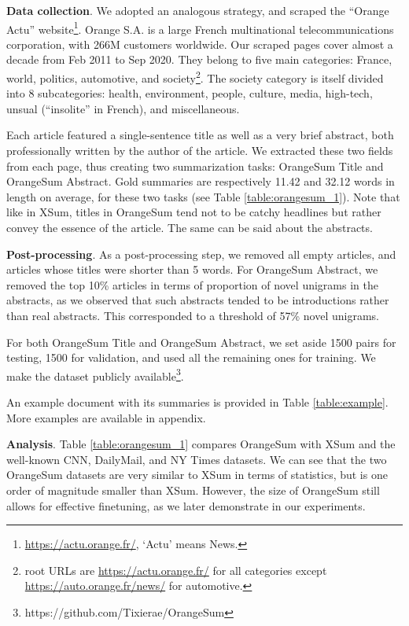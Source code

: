 \documentclass[11pt,a4paper]{article}
\begin{document}
\noindent \textbf{Data collection}.
We adopted an analogous strategy, and scraped the ``Orange Actu'' website\footnote{\url{https://actu.orange.fr/}, `Actu' means News.}.
Orange S.A. is a large French multinational telecommunications corporation, with 266M customers worldwide.
Our scraped pages cover almost a decade from Feb 2011 to Sep 2020.
They belong to five main categories: France, world, politics, automotive, and society\footnote{root URLs are \url{https://actu.orange.fr/} for all categories except \url{https://auto.orange.fr/news/} for automotive.}.
The society category is itself divided into 8 subcategories: health, environment, people, culture, media, high-tech, unsual (``insolite'' in French), and miscellaneous.

Each article featured a single-sentence title as well as a very brief abstract, both professionally written by the author of the article.
We extracted these two fields from each page, thus creating two summarization tasks: OrangeSum Title and OrangeSum Abstract.
Gold summaries are respectively 11.42 and 32.12 words in length on average, for these two tasks (see Table \ref{table:orangesum_1}).
Note that like in XSum, titles in OrangeSum tend not to be catchy headlines but rather convey the essence of the article.
The same can be said about the abstracts.

\noindent \textbf{Post-processing}.
As a post-processing step, we removed all empty articles, and articles whose titles were shorter than 5 words.
For OrangeSum Abstract, we removed the top 10\% articles in terms of proportion of novel unigrams in the abstracts, as we observed that such abstracts tended to be introductions rather than real abstracts.
This corresponded to a threshold of 57\% novel unigrams.

For both OrangeSum Title and OrangeSum Abstract, we set aside 1500 pairs for testing, 1500 for validation, and used all the remaining ones for training.
We make the dataset publicly available\footnote{https://github.com/Tixierae/OrangeSum}.

An example document with its summaries is provided in Table \ref{table:example}.
More examples are available in appendix.

\noindent \textbf{Analysis}.
Table \ref{table:orangesum_1} compares OrangeSum with XSum and the well-known CNN, DailyMail, and NY Times datasets.
We can see that the two OrangeSum datasets are very similar to XSum in terms of statistics, but is one order of magnitude smaller than XSum.
However, the size of OrangeSum still allows for effective finetuning, as we later demonstrate in our experiments.
\end{document}
